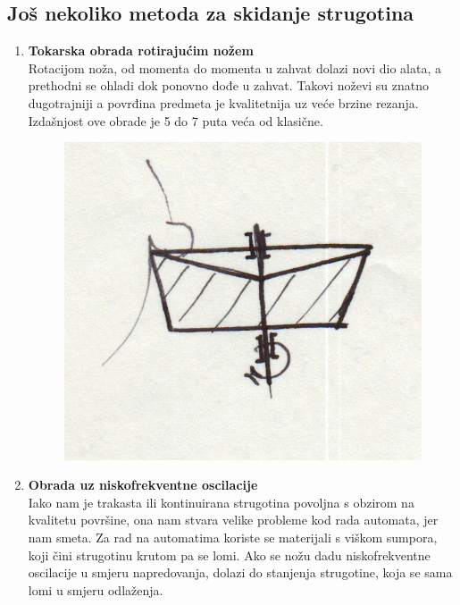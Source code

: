 \documentclass[a4paper,12pt]{article}
\numberwithin{figure}{section}
\begin{document}
\subsection{Još nekoliko metoda za skidanje strugotina}
\begin{enumerate}
\item \textbf{Tokarska obrada rotirajućim nožem} \\
Rotacijom noža, od momenta do momenta u zahvat dolazi novi dio alata, a prethodni se ohladi dok ponovno dođe u zahvat. Takovi noževi su znatno dugotrajniji a povrđina predmeta je kvalitetnija uz veće brzine rezanja. Izdašnjost ove obrade je 5 do 7 puta veća od klasične.
\begin{figure}[!h]
\centering
\includegraphics[scale=0.15]{image_64-1.png}
\end{figure}
\FloatBarrier
\item \textbf{Obrada uz niskofrekventne oscilacije} \\
Iako nam je trakasta ili kontinuirana strugotina povoljna s obzirom  na kvalitetu površine, ona nam stvara velike probleme kod rada automata, jer nam smeta. Za rad na automatima koriste se materijali s viškom sumpora, koji čini strugotinu krutom pa se lomi. Ako se nožu dadu niskofrekventne oscilacije u smjeru napredovanja, dolazi do stanjenja strugotine, koja se sama lomi u smjeru odlaženja.
\begin{figure}[!h]
\centering

\end{figure}
\end{enumerate}
\end{document}
